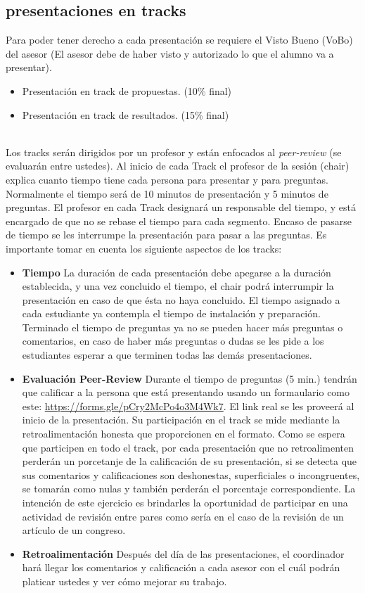 \documentclass[letterpaper, 10 pt, conference]{ieeeconf}  %
\begin{document}
\subsection{presentaciones en tracks}
Para poder tener derecho a cada presentación se requiere el Visto Bueno (VoBo) del asesor (El asesor debe de haber visto y autorizado lo que el alumno va a presentar).\\
\begin{itemize}
  \item Presentación en track de propuestas. (10\% final)
  \item Presentación en track de resultados.  (15\% final)
\end{itemize}
 \\
Los tracks serán dirigidos por un profesor y están enfocados al \textit{peer-review} (se evaluarán entre ustedes). Al inicio de cada Track el profesor de la sesión (chair) explica cuanto tiempo tiene cada persona para presentar y para preguntas. Normalmente el tiempo será de 10 minutos de presentación y 5 minutos de preguntas. El profesor en cada Track designará un responsable del tiempo, y está encargado de que no se rebase el tiempo para cada segmento. Encaso de pasarse de tiempo se les interrumpe la presentación para pasar a las preguntas. Es importante tomar en cuenta los siguiente aspectos de los tracks:\\
\begin{itemize}
    \item \textbf{Tiempo} La duración de cada presentación debe apegarse a la duración establecida, y una vez concluido el tiempo, el chair podrá interrumpir la presentación en caso de que ésta no haya concluido. El tiempo asignado a cada estudiante ya contempla el tiempo de instalación y preparación. Terminado el tiempo de preguntas ya no se pueden hacer más preguntas o comentarios, en caso de haber más preguntas o dudas se les pide a los estudiantes esperar a que terminen todas las demás presentaciones.
    \item \textbf{Evaluación Peer-Review} Durante el tiempo de preguntas (5 min.) tendrán que calificar a la persona que está presentando usando un formaulario como este: \url{https://forms.gle/pCry2McPo4o3M4Wk7}. El link real se les proveerá al inicio de la presentación. Su participación en el track se mide mediante la retroalimentación honesta que proporcionen en el formato. Como se espera que participen en todo el track, por cada presentación que no retroalimenten perderán un porcetanje de la calificación de su presentación, si se detecta que sus comentarios y calificaciones son deshonestas, superficiales o incongruentes, se tomarán como nulas y también perderán el porcentaje correspondiente. La intención de este ejercicio es brindarles la oportunidad de participar en una actividad de revisión entre pares como sería en el caso de la revisión de un artículo de un congreso.
    \item \textbf{Retroalimentación} Después del día de las presentaciones, el coordinador hará llegar los comentarios y calificación a cada asesor con el cuál podrán platicar ustedes y ver cómo mejorar su trabajo.
\end{itemize}
\end{document}
